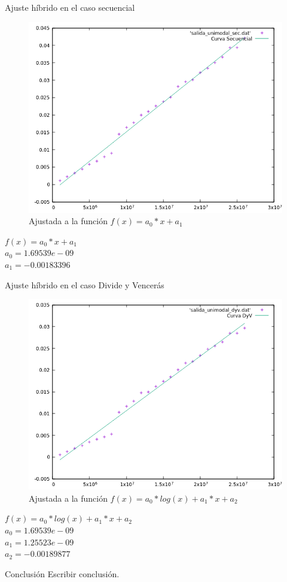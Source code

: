 \documentclass[12pt]{beamer}
\begin{document}
\begin{frame}{Ajuste híbrido en el caso secuencial}

\begin{figure}[H] 
\centering
\includegraphics[angle=0,scale=0.5]{img/AjusteHibridoSec.png} 
\caption{Ajustada a la función $f(x)=a_0*x+a_1$} 
\end{figure}

\end{frame}

\begin{frame}
$f(x)=a_0*x+a_1$
\\$a_0=1.69539e-09$
\\$a_1=-0.00183396$
\end{frame}

\begin{frame}{Ajuste híbrido en el caso Divide y Vencerás}

\begin{figure}[H] 
\centering
\includegraphics[angle=0,scale=0.5]{img/AjusteHibridoDyV.png} 
\caption{Ajustada a la función $f(x)=a_0*log(x)+a_1*x+a_2$} 
\end{figure}

\end{frame}

\begin{frame}
$f(x)=a_0*log(x)+a_1*x+a_2$
\\$a_0=1.69539e-09$
\\$a_1=1.25523e-09$
\\$a_2=-0.00189877$
\end{frame}

\begin{frame}{Conclusión}
Escribir conclusión.
\end{frame}
\end{document}
